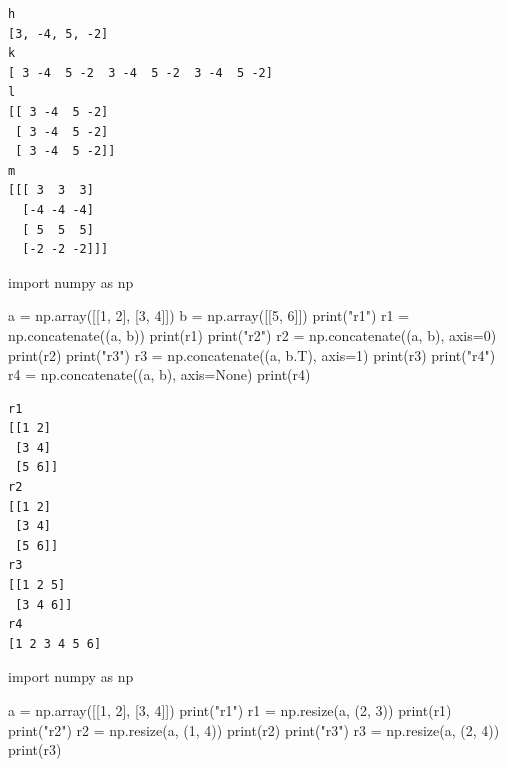 \documentclass[
  letterpaper,
  DIV=11,
  numbers=noendperiod]{scrreprt}
\newenvironment{Shaded}{\begin{snugshade}}{\end{snugshade}}
\newcommand{\BuiltInTok}[1]{\textcolor[rgb]{0.00,0.23,0.31}{#1}}
\newcommand{\DecValTok}[1]{\textcolor[rgb]{0.68,0.00,0.00}{#1}}
\newcommand{\ImportTok}[1]{\textcolor[rgb]{0.00,0.46,0.62}{#1}}
\newcommand{\NormalTok}[1]{\textcolor[rgb]{0.00,0.23,0.31}{#1}}
\newcommand{\OperatorTok}[1]{\textcolor[rgb]{0.37,0.37,0.37}{#1}}
\newcommand{\StringTok}[1]{\textcolor[rgb]{0.13,0.47,0.30}{#1}}
\newcommand{\VariableTok}[1]{\textcolor[rgb]{0.07,0.07,0.07}{#1}}
\begin{document}
\begin{verbatim}
h
[3, -4, 5, -2]
k
[ 3 -4  5 -2  3 -4  5 -2  3 -4  5 -2]
l
[[ 3 -4  5 -2]
 [ 3 -4  5 -2]
 [ 3 -4  5 -2]]
m
[[[ 3  3  3]
  [-4 -4 -4]
  [ 5  5  5]
  [-2 -2 -2]]]
\end{verbatim}

\begin{Shaded}
\begin{Highlighting}[]
\ImportTok{import}\NormalTok{ numpy }\ImportTok{as}\NormalTok{ np}

\NormalTok{a }\OperatorTok{=}\NormalTok{ np.array([[}\DecValTok{1}\NormalTok{, }\DecValTok{2}\NormalTok{], [}\DecValTok{3}\NormalTok{, }\DecValTok{4}\NormalTok{]])}
\NormalTok{b }\OperatorTok{=}\NormalTok{ np.array([[}\DecValTok{5}\NormalTok{, }\DecValTok{6}\NormalTok{]])}
\BuiltInTok{print}\NormalTok{(}\StringTok{"r1"}\NormalTok{)}
\NormalTok{r1 }\OperatorTok{=}\NormalTok{ np.concatenate((a, b))}
\BuiltInTok{print}\NormalTok{(r1)}
\BuiltInTok{print}\NormalTok{(}\StringTok{"r2"}\NormalTok{)}
\NormalTok{r2 }\OperatorTok{=}\NormalTok{ np.concatenate((a, b), axis}\OperatorTok{=}\DecValTok{0}\NormalTok{)}
\BuiltInTok{print}\NormalTok{(r2)}
\BuiltInTok{print}\NormalTok{(}\StringTok{"r3"}\NormalTok{)}
\NormalTok{r3 }\OperatorTok{=}\NormalTok{ np.concatenate((a, b.T), axis}\OperatorTok{=}\DecValTok{1}\NormalTok{)}
\BuiltInTok{print}\NormalTok{(r3)}
\BuiltInTok{print}\NormalTok{(}\StringTok{"r4"}\NormalTok{)}
\NormalTok{r4 }\OperatorTok{=}\NormalTok{ np.concatenate((a, b), axis}\OperatorTok{=}\VariableTok{None}\NormalTok{)}
\BuiltInTok{print}\NormalTok{(r4)}
\end{Highlighting}
\end{Shaded}

\begin{verbatim}
r1
[[1 2]
 [3 4]
 [5 6]]
r2
[[1 2]
 [3 4]
 [5 6]]
r3
[[1 2 5]
 [3 4 6]]
r4
[1 2 3 4 5 6]
\end{verbatim}

\begin{Shaded}
\begin{Highlighting}[]
\ImportTok{import}\NormalTok{ numpy }\ImportTok{as}\NormalTok{ np}

\NormalTok{a }\OperatorTok{=}\NormalTok{ np.array([[}\DecValTok{1}\NormalTok{, }\DecValTok{2}\NormalTok{], [}\DecValTok{3}\NormalTok{, }\DecValTok{4}\NormalTok{]])}
\BuiltInTok{print}\NormalTok{(}\StringTok{"r1"}\NormalTok{)}
\NormalTok{r1 }\OperatorTok{=}\NormalTok{ np.resize(a, (}\DecValTok{2}\NormalTok{, }\DecValTok{3}\NormalTok{))}
\BuiltInTok{print}\NormalTok{(r1)}
\BuiltInTok{print}\NormalTok{(}\StringTok{"r2"}\NormalTok{)}
\NormalTok{r2 }\OperatorTok{=}\NormalTok{ np.resize(a, (}\DecValTok{1}\NormalTok{, }\DecValTok{4}\NormalTok{))}
\BuiltInTok{print}\NormalTok{(r2)}
\BuiltInTok{print}\NormalTok{(}\StringTok{"r3"}\NormalTok{)}
\NormalTok{r3 }\OperatorTok{=}\NormalTok{ np.resize(a, (}\DecValTok{2}\NormalTok{, }\DecValTok{4}\NormalTok{))}
\BuiltInTok{print}\NormalTok{(r3)}
\end{Highlighting}
\end{Shaded}
\end{document}
